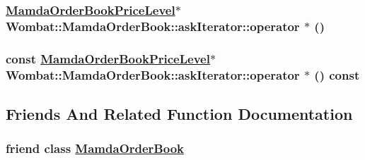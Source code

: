 \hypertarget{classWombat_1_1MamdaOrderBook_1_1askIterator_992e3a609b4d0bb7c70a8bc2c50b6540}{
\subsubsection[operator $\ast$]{\setlength{\rightskip}{0pt plus 5cm}\hyperlink{classWombat_1_1MamdaOrderBookPriceLevel}{Mamda\-Order\-Book\-Price\-Level}$\ast$ Wombat::Mamda\-Order\-Book::ask\-Iterator::operator $\ast$ ()}}
\label{classWombat_1_1MamdaOrderBook_1_1askIterator_992e3a609b4d0bb7c70a8bc2c50b6540}


\hypertarget{classWombat_1_1MamdaOrderBook_1_1askIterator_9800f334830c63a8142f7e7b520db4d9}{
\subsubsection[operator $\ast$]{\setlength{\rightskip}{0pt plus 5cm}const \hyperlink{classWombat_1_1MamdaOrderBookPriceLevel}{Mamda\-Order\-Book\-Price\-Level}$\ast$ Wombat::Mamda\-Order\-Book::ask\-Iterator::operator $\ast$ () const}}
\label{classWombat_1_1MamdaOrderBook_1_1askIterator_9800f334830c63a8142f7e7b520db4d9}




\subsection{Friends And Related Function Documentation}
\hypertarget{classWombat_1_1MamdaOrderBook_1_1askIterator_51cb271c9914c74f99c60cb638c26be7}{
\subsubsection[MamdaOrderBook]{\setlength{\rightskip}{0pt plus 5cm}friend class \hyperlink{classWombat_1_1MamdaOrderBook}{Mamda\-Order\-Book}}}
\label{classWombat_1_1MamdaOrderBook_1_1askIterator_51cb271c9914c74f99c60cb638c26be7}




